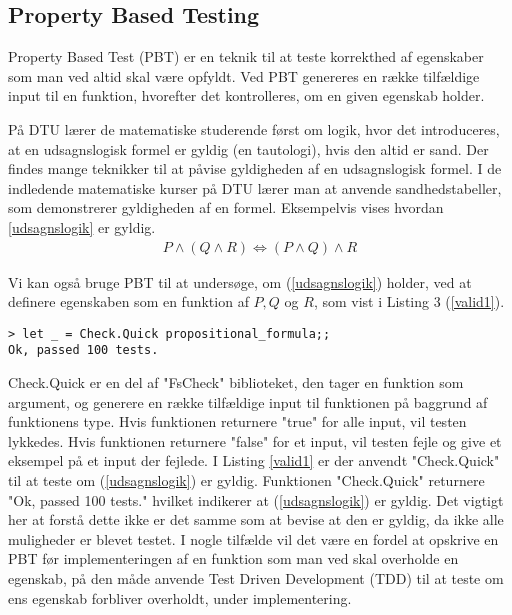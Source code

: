 \subsection{Property Based Testing}
Property Based Test (PBT) er en teknik til at teste korrekthed af egenskaber som man ved altid skal være opfyldt. Ved PBT genereres en række tilfældige input til en funktion, hvorefter det kontrolleres, om en given egenskab holder. 

På DTU lærer de matematiske studerende først om logik, hvor det introduceres, at en udsagnslogisk formel er gyldig (en tautologi), hvis den altid er sand. Der findes mange teknikker til at påvise gyldigheden af en udsagnslogisk formel. I de indledende matematiske kurser på DTU lærer man at anvende sandhedstabeller, som demonstrerer gyldigheden af en formel. Eksempelvis vises hvordan \ref{udsagnslogik} er gyldig.
\begin{gather}
    P \land (Q \land R) \iff (P \land Q) \land R
    \label{udsagnslogik}
\end{gather}

Vi kan også bruge PBT til at undersøge, om (\ref{udsagnslogik}) holder, ved at definere egenskaben som en funktion af $P, Q$ og $R$, som vist i Listing 3 (\ref{valid1}).



\begin{lstlisting}[style=output, label={lst:output_example}, caption={Output ved PBT af (\ref{udsagnslogik})}]
> let _ = Check.Quick propositional_formula;;
Ok, passed 100 tests.
\end{lstlisting}

Check.Quick er en del af "FsCheck" biblioteket, den tager en funktion som argument, og generere en række tilfældige input til funktionen på baggrund af funktionens type. Hvis funktionen returnere "true" for alle input, vil testen lykkedes. Hvis funktionen returnere "false" for et input, vil testen fejle og give et eksempel på et input der fejlede. I Listing \ref{valid1} er der anvendt "Check.Quick" til at teste om (\ref{udsagnslogik}) er gyldig. Funktionen "Check.Quick" returnere "Ok, passed 100 tests." hvilket indikerer at (\ref{udsagnslogik}) er gyldig. Det vigtigt her at forstå dette ikke er det samme som at bevise at den er gyldig, da ikke alle muligheder er blevet testet. 
I nogle tilfælde vil det være en fordel at opskrive en PBT før implementeringen af en funktion som man ved skal overholde en egenskab, på den måde anvende Test Driven Development (TDD)  til at teste om ens egenskab forbliver overholdt, under implementering.
